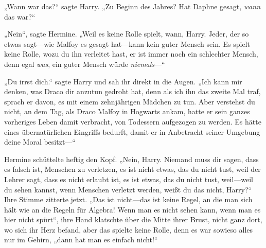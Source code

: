„Wann war das?“ sagte Harry. „Zu Beginn des Jahres? Hat Daphne gesagt, \emph{wann} das war?“

„Nein“, sagte Hermine. „Weil es keine Rolle spielt, wann, Harry. Jeder, der so etwas sagt—wie Malfoy es gesagt hat—kann kein guter Mensch sein. Es spielt keine Rolle, wozu du ihn verleitet hast, er ist immer noch ein schlechter Mensch, denn egal \emph{was}, ein guter Mensch würde \emph{niemals}—“

„Du irrst dich.“ sagte Harry und sah ihr direkt in die Augen. „Ich kann mir denken, was Draco dir anzutun gedroht hat, denn als ich ihn das zweite Mal traf, sprach er davon, es mit einem zehnjährigen Mädchen zu tun. Aber verstehst du nicht, an dem Tag, als Draco Malfoy in Hogwarts ankam, hatte er sein ganzes vorheriges Leben damit verbracht, von Todessern aufgezogen zu werden. Es hätte eines übernatürlichen Eingriffs bedurft, damit er in Anbetracht seiner Umgebung deine Moral besitzt—“

Hermine schüttelte heftig den Kopf. „Nein, Harry. Niemand muss dir sagen, dass es falsch ist, Menschen zu verletzen, es ist nicht etwas, das du nicht tust, weil der Lehrer sagt, dass es nicht erlaubt ist, es ist etwas, das du nicht tust, weil—weil du sehen kannst, wenn Menschen verletzt werden, weißt du das nicht, Harry?“
Ihre Stimme zitterte jetzt.
„Das ist nicht—das ist keine Regel, an die man sich hält wie an die Regeln für Algebra! Wenn man es nicht sehen kann, wenn man es hier nicht spürt“, ihre Hand klatschte über die Mitte ihrer Brust, nicht ganz dort, wo sich ihr Herz befand, aber das spielte keine Rolle, denn es war sowieso alles nur im Gehirn, „dann hat man es einfach nicht!“

